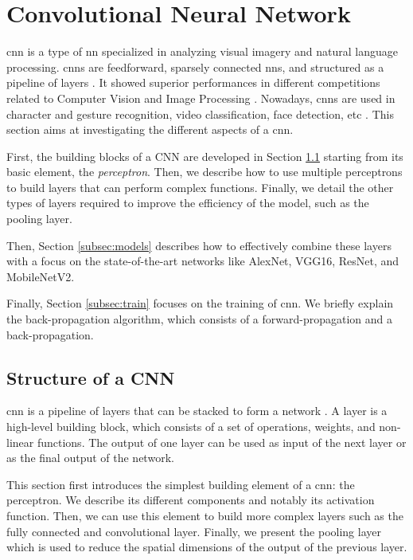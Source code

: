\section{Convolutional Neural Network} \label{sec:cnn}
\acrshort{cnn} is a type of \acrshort{nn} specialized in analyzing visual imagery and natural language processing. \acrshort{cnn}s are feedforward, sparsely connected \acrshort{nn}s, and structured as a pipeline of layers \cite{abdelouahab_accelerating_2018}. It showed superior performances in different competitions related to Computer Vision and Image Processing \cite{khan_survey_2020}. Nowadays, \acrshort{cnn}s are used in character and gesture recognition, video classification, face detection, etc \cite{shawahna_fpga-based_2019}. This section aims at investigating the different aspects of a \acrshort{cnn}.

First, the building blocks of a CNN are developed in Section \ref{subsec:layer} starting from its basic element, the \textit{perceptron}. Then, we describe how to use multiple perceptrons to build layers that can perform complex functions. Finally, we detail the other types of layers required to improve the efficiency of the model, such as the pooling layer.

Then, Section \ref{subsec:models} describes how to effectively combine these layers with a focus on the state-of-the-art networks like AlexNet, VGG16, ResNet, and MobileNetV2.

Finally, Section \ref{subsec:train} focuses on the training of \acrshort{cnn}. We briefly explain the back-propagation algorithm, which consists of a forward-propagation and a back-propagation.
%
%
\subsection{Structure of a CNN} \label{subsec:layer}
%
\acrshort{cnn} is a pipeline of layers that can be stacked to form a network \cite{abdelouahab_accelerating_2018}. A layer is a high-level building block, which consists of a set of operations, weights, and non-linear functions. The output of one layer can be used as input of the next layer or as the final output of the network. 

This section first introduces the simplest building element of a \acrshort{cnn}: the perceptron. We describe its different components and notably its activation function. Then, we can use this element to build more complex layers such as the fully connected and convolutional layer. Finally, we present the pooling layer which is used to reduce the spatial dimensions of the output of the previous layer.
%
%

%

%

%

%

%

%
